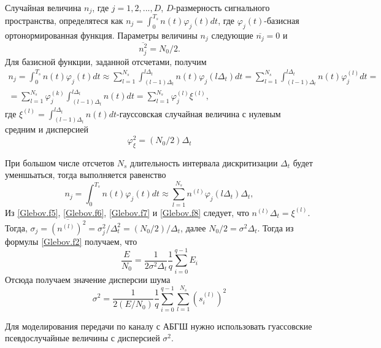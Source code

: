 	Случайная величина $n_j$, где $j=1,2,...,D$, $D$-размерность сигнального пространства, 
	определятеся как $n_j=\int_{0}^{T_s}n(t)\varphi_j(t)dt$, где $\varphi_j(t)$-базисная ортонормированная функция. 
	Параметры величины $n_j$ следующие $\overline{n_j}=0$ и 
	\begin{equation}
	\label{Glebov.f5}
		\overline{n_j^2}=N_0/2.
	\end{equation}
	Для базисной функции, заданной отсчетами, получим
	\begin{equation}
	\label{Glebov.f6}
	\begin{split}
		 n_j=\int_{0}^{T_s}n(t)\varphi_j(t)dt\approx\sum_{l=1}^{N_s}\int_{(l-1)\Delta_t}^{l\Delta_t}n(t)\varphi_j(l\Delta_t)dt=\sum_{l=1}^{N_s}\int_{(l-1)\Delta_t}^{l\Delta_t}n(t)\varphi_j^{(l)}dt= \\		 
		  =\sum_{l=1}^{N_s}\varphi_j^{(k)}\int_{(l-1)\Delta_t}^{l\Delta_t}n(t)dt=\sum_{l=1}^{N_s}\varphi_j^{(l)}\xi^{(l)},
	\end{split}	
	\end{equation}
	где $\xi^{(l)}=\int_{(l-1)\Delta_t}^{l\Delta_t}n(t)dt$-гауссовская случайная величина с нулевым средним и дисперсией
	\begin{equation}
	\label{Glebov.f7}
		\varphi_\xi^2=(N_0/2)\Delta_t
	\end{equation}
	
	При большом числе отсчетов $N_s$ длительность интервала дискритизации $\Delta_t$ будет уменшьаться, тогда выполняется равенство
	\begin{equation}
	\label{Glebov.f8}
		n_j=\int_{0}^{T_s}n(t)\varphi_j(t)dt\approx\sum_{l=1}^{N_s}n^{(l)}\varphi_j(l\Delta_t)\Delta_t,
	\end{equation}
	Из \ref{Glebov.f5}, \ref{Glebov.f6}, \ref{Glebov.f7} и \ref{Glebov.f8} следует,
	что $n^{(l)}\Delta_t=\xi^{(l)}$. Тогда, $\sigma_j=\overline{(n^{(l)})^2}=\sigma_j^2/\Delta_t^2=(N_0/2)/\Delta_t$, 
	далее $N_0/2=\sigma^2\Delta_t$. Тогда из формулы \ref{Glebov.f2} получаем, что
	\begin{equation}
	\frac{E}{N_0}=\frac{1}{2\sigma^2\Delta_t}\frac{1}{q}\sum_{i=0}^{q-1}E_i
	\end{equation}
	Отсюда получаем значение дисперсии шума
	\begin{equation}
		\sigma^2=\frac{1}{2(E/N_0)}\frac{1}{q}\sum_{i=0}^{q-1}\sum_{l=1}^{N_s}(s_i^{(l)})^2
	\end{equation}
	
	Для моделирования передачи по каналу с АБГШ нужно использовать гуассовские псевдослучайные величины с дисперсией 
	$\sigma^2$.
	
